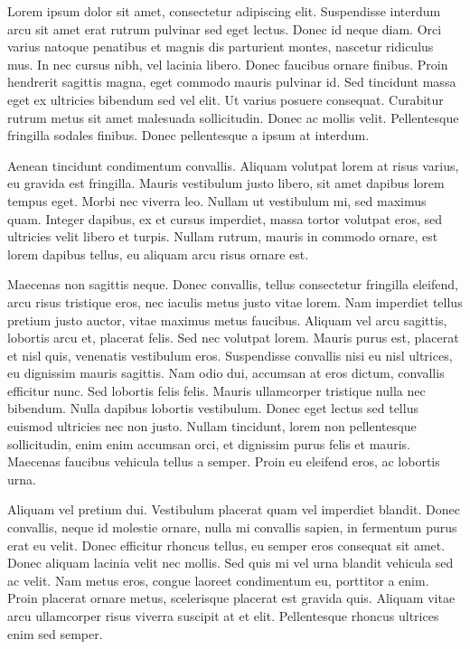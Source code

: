 Lorem ipsum dolor sit amet, consectetur adipiscing elit. Suspendisse interdum arcu sit amet erat rutrum pulvinar sed eget lectus. Donec id neque diam. Orci varius natoque penatibus et magnis dis parturient montes, nascetur ridiculus mus. In nec cursus nibh, vel lacinia libero. Donec faucibus ornare finibus. Proin hendrerit sagittis magna, eget commodo mauris pulvinar id. Sed tincidunt massa eget ex ultricies bibendum sed vel elit. Ut varius posuere consequat. Curabitur rutrum metus sit amet malesuada sollicitudin. Donec ac mollis velit. Pellentesque fringilla sodales finibus. Donec pellentesque a ipsum at interdum.

Aenean tincidunt condimentum convallis. Aliquam volutpat lorem at risus varius, eu gravida est fringilla. Mauris vestibulum justo libero, sit amet dapibus lorem tempus eget. Morbi nec viverra leo. Nullam ut vestibulum mi, sed maximus quam. Integer dapibus, ex et cursus imperdiet, massa tortor volutpat eros, sed ultricies velit libero et turpis. Nullam rutrum, mauris in commodo ornare, est lorem dapibus tellus, eu aliquam arcu risus ornare est.

Maecenas non sagittis neque. Donec convallis, tellus consectetur fringilla eleifend, arcu risus tristique eros, nec iaculis metus justo vitae lorem. Nam imperdiet tellus pretium justo auctor, vitae maximus metus faucibus. Aliquam vel arcu sagittis, lobortis arcu et, placerat felis. Sed nec volutpat lorem. Mauris purus est, placerat et nisl quis, venenatis vestibulum eros. Suspendisse convallis nisi eu nisl ultrices, eu dignissim mauris sagittis. Nam odio dui, accumsan at eros dictum, convallis efficitur nunc. Sed lobortis felis felis. Mauris ullamcorper tristique nulla nec bibendum. Nulla dapibus lobortis vestibulum. Donec eget lectus sed tellus euismod ultricies nec non justo. Nullam tincidunt, lorem non pellentesque sollicitudin, enim enim accumsan orci, et dignissim purus felis et mauris. Maecenas faucibus vehicula tellus a semper. Proin eu eleifend eros, ac lobortis urna.

Aliquam vel pretium dui. Vestibulum placerat quam vel imperdiet blandit. Donec convallis, neque id molestie ornare, nulla mi convallis sapien, in fermentum purus erat eu velit. Donec efficitur rhoncus tellus, eu semper eros consequat sit amet. Donec aliquam lacinia velit nec mollis. Sed quis mi vel urna blandit vehicula sed ac velit. Nam metus eros, congue laoreet condimentum eu, porttitor a enim. Proin placerat ornare metus, scelerisque placerat est gravida quis. Aliquam vitae arcu ullamcorper risus viverra suscipit at et elit. Pellentesque rhoncus ultrices enim sed semper.

